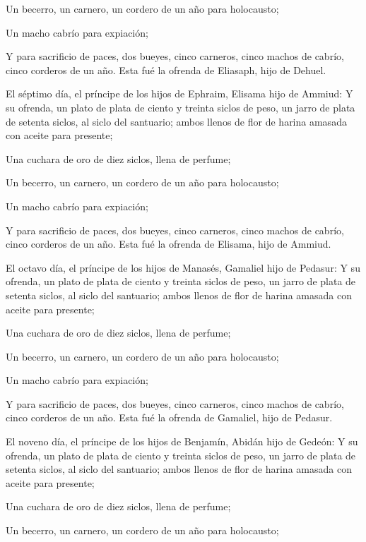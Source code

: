  Un becerro, un carnero, un cordero de un año para
holocausto;

 Un macho cabrío para expiación;

 Y para sacrificio de paces, dos bueyes, cinco carneros,
cinco machos de cabrío, cinco corderos de un año. Esta fué la ofrenda de
Eliasaph, hijo de Dehuel.

 El séptimo día, el príncipe de los hijos de Ephraim,
Elisama hijo de Ammiud:  Y su ofrenda, un plato de plata de
ciento y treinta siclos de peso, un jarro de plata de setenta siclos, al
siclo del santuario; ambos llenos de flor de harina amasada con aceite
para presente;

 Una cuchara de oro de diez siclos, llena de perfume;

 Un becerro, un carnero, un cordero de un año para
holocausto;

 Un macho cabrío para expiación;

 Y para sacrificio de paces, dos bueyes, cinco carneros,
cinco machos de cabrío, cinco corderos de un año. Esta fué la ofrenda de
Elisama, hijo de Ammiud.

 El octavo día, el príncipe de los hijos de Manasés,
Gamaliel hijo de Pedasur:  Y su ofrenda, un plato de plata
de ciento y treinta siclos de peso, un jarro de plata de setenta siclos,
al siclo del santuario; ambos llenos de flor de harina amasada con
aceite para presente;

 Una cuchara de oro de diez siclos, llena de perfume;

 Un becerro, un carnero, un cordero de un año para
holocausto;

 Un macho cabrío para expiación;

 Y para sacrificio de paces, dos bueyes, cinco carneros,
cinco machos de cabrío, cinco corderos de un año. Esta fué la ofrenda de
Gamaliel, hijo de Pedasur.

 El noveno día, el príncipe de los hijos de Benjamín,
Abidán hijo de Gedeón:  Y su ofrenda, un plato de plata de
ciento y treinta siclos de peso, un jarro de plata de setenta siclos, al
siclo del santuario; ambos llenos de flor de harina amasada con aceite
para presente;

 Una cuchara de oro de diez siclos, llena de perfume;

 Un becerro, un carnero, un cordero de un año para
holocausto;

